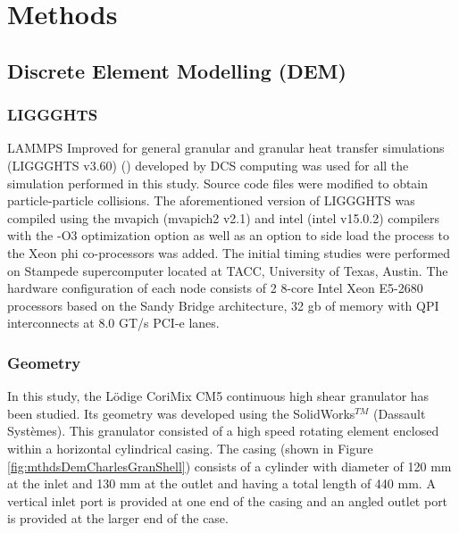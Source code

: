 \documentclass[preprint,11pt,authoryear]{elsarticle}
\begin{document}
\section{Methods}

\subsection{Discrete Element Modelling (DEM)}
\subsubsection{LIGGGHTS}
 LAMMPS Improved for general granular and granular heat transfer simulations (LIGGGHTS v3.60) 
(\cite{Kloss2012}) developed by DCS computing was used for all the simulation performed in this 
study. Source code files were modified to obtain particle-particle 
collisions. The aforementioned version of LIGGGHTS was compiled using the mvapich (mvapich2 v2.1) 
and intel (intel v15.0.2) compilers with the -O3 optimization option as well as an option to side load the 
process to the Xeon phi co-processors was added. The initial timing studies were performed on Stampede 
supercomputer located at TACC, University of Texas, Austin. The hardware configuration of each node 
consists of 2 8-core Intel Xeon E5-2680 processors based on the Sandy Bridge architecture, 32 gb of 
memory with QPI interconnects at 8.0 GT/s PCI-e lanes.


\subsubsection{Geometry}    

 In this study, the L\"{o}dige CoriMix CM5 continuous high shear granulator has been studied. Its 
geometry was developed using the SolidWorks$^{TM}$ (Dassault Syst\`{e}mes). This granulator 
consisted of a high speed rotating element enclosed within a horizontal cylindrical casing. The casing 
(shown in Figure \ref{fig:mthdsDemCharlesGranShell}) consists of a cylinder with diameter of 120 mm 
at the inlet and 130 mm at the outlet and having a total length of 440 mm. A vertical inlet port is 
provided at one end of the casing and an angled outlet port is provided at the larger end of the case. 
\end{document}
